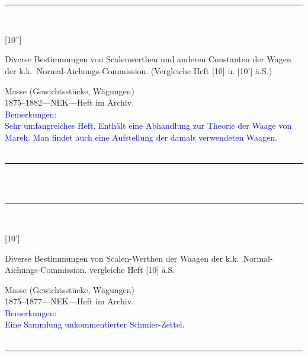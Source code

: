 \\
\vspace*{-2.5pt}\\
\parbox{\textwidth}{%
\rule{\textwidth}{1pt}\vspace*{-3mm}\\
\begin{minipage}[t]{0.22\textwidth}\vspace{0pt}
\Huge\rule[-4mm]{0cm}{1cm}[10'']
\end{minipage}
\hfill
\begin{minipage}[t]{0.78\textwidth}\vspace{0pt}
\large Diverse Bestimmungen von Scalenwerthen und anderen Constanten der Wagen der k.k.\ Normal-Aichungs-Commission. (Vergleiche Heft [10] u. [10'] ä.S.)\rule[-2mm]{0mm}{2mm}
\end{minipage}
{\footnotesize\flushright
Masse (Gewichtsstücke, Wägungen)\\
}
1875--1882\quad---\quad NEK\quad---\quad Heft im Archiv.\\
\textcolor{blue}{Bemerkungen:\\{}
Sehr umfangreiches Heft. Enthält eine Abhandlung zur Theorie der Waage von Marek. Man findet auch eine Aufstellung der damals verwendeten Waagen.\\{}
}
\\[-15pt]
\rule{\textwidth}{1pt}
}
\\
\vspace*{-2.5pt}\\
\parbox{\textwidth}{%
\rule{\textwidth}{1pt}\vspace*{-3mm}\\
\begin{minipage}[t]{0.2\textwidth}\vspace{0pt}
\Huge\rule[-4mm]{0cm}{1cm}[10']
\end{minipage}
\hfill
\begin{minipage}[t]{0.8\textwidth}\vspace{0pt}
\large Diverse Bestimmungen von Scalen-Werthen der Waagen der k.k.\ Normal-Aichungs-Commission. vergleiche Heft [10] ä.S.\rule[-2mm]{0mm}{2mm}
\end{minipage}
{\footnotesize\flushright
Masse (Gewichtsstücke, Wägungen)\\
}
1875--1877\quad---\quad NEK\quad---\quad Heft im Archiv.\\
\textcolor{blue}{Bemerkungen:\\{}
Eine Sammlung unkommentierter Schmier-Zettel.\\{}
}
\\[-15pt]
\rule{\textwidth}{1pt}
}
